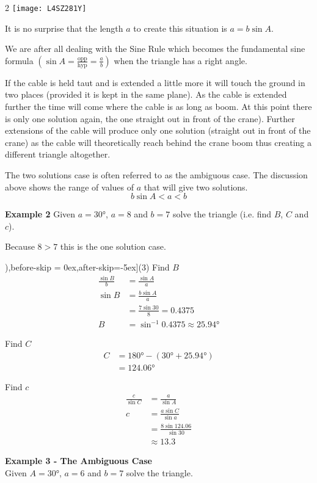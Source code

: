 \columnsep =30pt
\begin {multicols}{2}
\texttt{[image: L4SZ281Y]}

It is no surprise that the length $a$ to create this situation is $a =b \sin  A\text{.}$ 

We are after all dealing with the Sine Rule which becomes the fundamental sine formula $\left (\sin  A =\frac{\text{opp}}{\text{hyp}} =\frac{a}{b}\right )$ when the triangle has a right angle. 
\end {multicols}

If the cable is held taut and is extended a little more it will touch the ground in two places (provided it is kept in the same plane). As the cable is extended further the time will come where the cable is as long as boom. At this point there is only one solution again, the one straight out in front of the crane). Further extensions of the cable will produce only one solution (straight out in front of the crane) as the cable will theoretically reach behind the crane boom thus creating a different triangle altogether. 

The two solutions case is often referred to as the ambiguous case. The discussion above shows the range of values of $a$ that will give two solutions.
\begin{equation*}b \sin  A <a <b
\end{equation*}

\textbf{Example 2} Given $a =\ang{30} $, $a =8$ and $b =7$ solve the triangle (i.e. find $B$, $C$ and $c$).    
\setlength\fboxrule{0in}\setlength\fboxsep{0.2in}

Because $8 >7$ this is the one solution case. 
\begin{tasks}[counter-format=(tsk[1]),before-skip = {0ex},after-skip={-5ex}](3)
\task Find $B$
\begin{align*}\frac{\sin  B}{b} &  = \frac{\sin  A}{a} \\
\sin  B &  = \frac{b \sin  A}{a} \\
&  = \frac{7 \sin  30 }{8} =0.4375 \\
B &  = \sin ^{ -1} 0.4375 \approx \ang{25.94} \end{align*}

\task Find $C$
\begin{align*}C &  = \ang{180}  -(\ang{30}  +\ang{25.94} ) \\
&  = \ang{124.06} \end{align*}

\task Find $c$
\begin{align*}\frac{c}{\sin  C} &  = \frac{a}{\sin  A} \\
c &  = \frac{a \sin  C}{\sin a} \\
&  = \frac{8 \sin  124.06 }{\sin  30 } \\
&  \approx   13.3\end{align*}
\end{tasks}
\textbf{Example 3 - The Ambiguous Case} \\
Given $A =\ang{30} $, $a =6$ and $b =7$ solve the triangle. 

